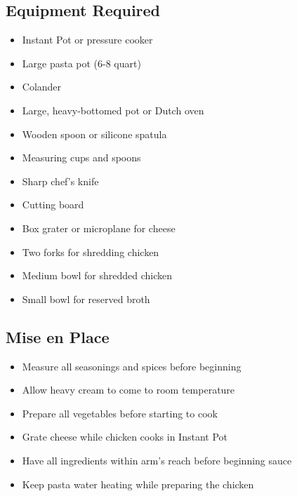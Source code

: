 \documentclass[11pt,letterpaper]{article}
\begin{document}
\newpage

{\small
\setlength{\columnsep}{20pt}
\setlength{\multicolsep}{6pt}
\begin{multicols}{2}
\setlength{\parindent}{0pt}
\setlength{\parskip}{4pt}

\subsection*{Equipment Required}
\begin{itemize}
    \item Instant Pot or pressure cooker
    \item Large pasta pot (6-8 quart)
    \item Colander
    \item Large, heavy-bottomed pot or Dutch oven
    \item Wooden spoon or silicone spatula
    \item Measuring cups and spoons
    \item Sharp chef's knife
    \item Cutting board
    \item Box grater or microplane for cheese
    \item Two forks for shredding chicken
    \item Medium bowl for shredded chicken
    \item Small bowl for reserved broth
\end{itemize}

\subsection*{Mise en Place}
\begin{itemize}
    \item Measure all seasonings and spices before beginning
    \item Allow heavy cream to come to room temperature
    \item Prepare all vegetables before starting to cook
    \item Grate cheese while chicken cooks in Instant Pot
    \item Have all ingredients within arm's reach before beginning sauce
    \item Keep pasta water heating while preparing the chicken
\end{itemize}


\end{multicols}}
\end{document}
